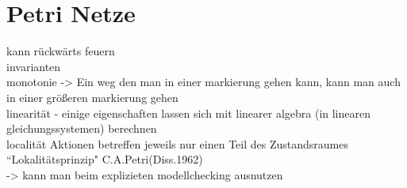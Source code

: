 

\chapter{Petri Netze}

kann rückwärts feuern\\

invarianten\\

monotonie -> Ein weg den man in einer markierung gehen kann, kann man auch in einer größeren markierung gehen\\
linearität - einige eigenschaften lassen sich mit linearer algebra (in linearen gleichungssystemen) berechnen\\
localität Aktionen betreffen jeweils nur einen Teil des Zustandsraumes “Lokalitätsprinzip" C.A.Petri(Diss.1962)\\
-> kann man beim explizieten modellchecking ausnutzen\\